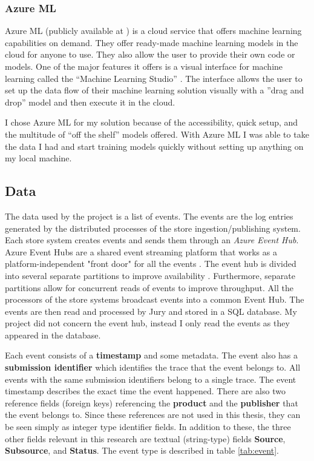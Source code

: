 \subsubsection{Azure ML}

Azure ML (publicly available at \cite{azuremlpub}) is a cloud service that offers machine learning capabilities on demand. 
They offer ready-made machine learning models in the cloud for anyone to use.
They also allow the user to provide their own code or models.
One of the major features it offers is a visual interface for machine learning called the ``Machine Learning Studio'' \cite{azureml}.
The interface allows the user to set up the data flow of their machine learning solution visually with a ''drag and drop'' model and then execute it in the cloud.

I chose Azure ML for my solution because of the accessibility, quick setup, and the multitude of ``off the shelf'' models offered.
With Azure ML I was able to take the data I had and start training models quickly without setting up anything on my local machine.

\subsection{Data}
The data used by the project is a list of events. The events are the log entries generated by the distributed processes of the store ingestion/publishing system. Each store system creates events and sends them through an \textit{Azure Event Hub}. 
Azure Event Hubs are a shared event streaming platform that works as a platform-independent "front door" for all the events \cite{eventhubs}. 
The event hub is divided into several separate partitions to improve availability \cite{eventhubavail}.
Furthermore, separate partitions allow for concurrent reads of events to improve throughput.
All the processors of the store systems broadcast events into a common Event Hub.
The events are then read and processed by Jury and stored in a SQL database.
My project did not concern the event hub, instead I only read the events as they appeared in the database.

Each event consists of a \textbf{timestamp} and some metadata. 
The event also has a \textbf{submission identifier} which identifies the trace that the event belongs to.
All events with the same submission identifiers belong to a single trace.
The event timestamp describes the exact time the event happened. 
There are also two reference fields (foreign keys) referencing the \textbf{product} and the \textbf{publisher} that the event belongs to. 
Since these references are not used in this thesis, they can be seen simply as integer type identifier fields.
In addition to these, the three other fields relevant in this research are textual (string-type) fields \textbf{Source}, \textbf{Subsource}, and \textbf{Status}.
The event type is described in table \ref{tab:event}.

